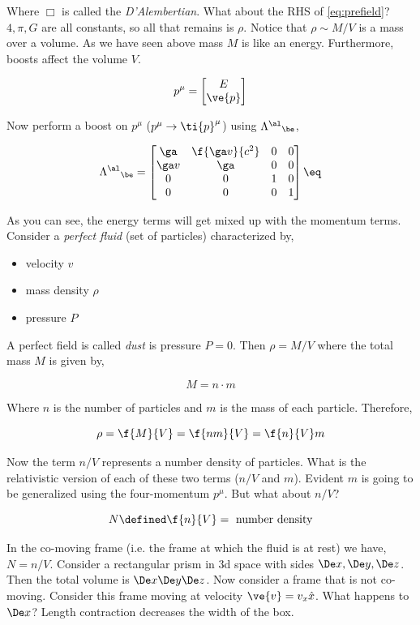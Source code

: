\documentclass{article}
\newcommand{\mtrx}[1]{
    \begin{bmatrix}
    #1
    \end{bmatrix}
}
\begin{document}
Where $\Box$ is called the \textit{D'Alembertian}. What about the RHS of \eqref{eq:prefield}? $4,\pi,G$ are all constants, so all that remains is $\rho$. Notice that $\rho \sim M / V$ is a mass over a volume. As we have seen above mass $M$ is like an energy. Furthermore, boosts affect the volume $V$.

\[ p^\mu= \mtrx{E \\ \ve{p}} \]

Now perform a boost on $p^\mu$ ($p^\mu \to \ti{p}^\mu$) using ${\Lam^{\al}}_\be$,

\[ {\Lam^{\al}}_\be = \mtrx{\ga & \f{\ga v}{c^2} & 0 & 0 \\ \ga v & \ga & 0 & 0  \\ 0 & 0 & 1 & 0  \\ 0 & 0 & 0 & 1 } \eq \label{eq:boost} \]

As you can see, the energy terms will get mixed up with the momentum terms. \\

Consider a \textit{perfect fluid} (set of particles) characterized by,
\begin{itemize}
    \item velocity $v$
    \item mass density $\rho$
    \item pressure $P$
\end{itemize}

A perfect field is called \textit{dust} is pressure $P = 0$. Then $\rho = M/V$ where the total mass $M$ is given by,

\[ M = n \cdot m \]

Where $n$ is the number of particles and $m$ is the mass of each particle. Therefore,

\[ \rho = \f{M}{V} = \f{nm}{V} = \f{n}{V} m \]

Now the term $n/V$ represents a number density of particles. What is the relativistic version of each of these two terms ($n/V$ and $m$). Evident $m$ is going to be generalized using the four-momentum $p^\mu$. But what about $n/V$?

\[ N \defined \f{n}{V} = \text{ number density} \]

In the co-moving frame (i.e. the frame at which the fluid is at rest) we have, $N = n/V$. Consider a rectangular prism in 3d space with sides $\De x, \De y, \De z$. Then the total volume is $\De x\De y\De z$. Now consider a frame that is not co-moving. Consider this frame moving at velocity $\ve{v} = v_x \hat{x}$. What happens to $\De x$? Length contraction decreases the width of the box.
\end{document}
